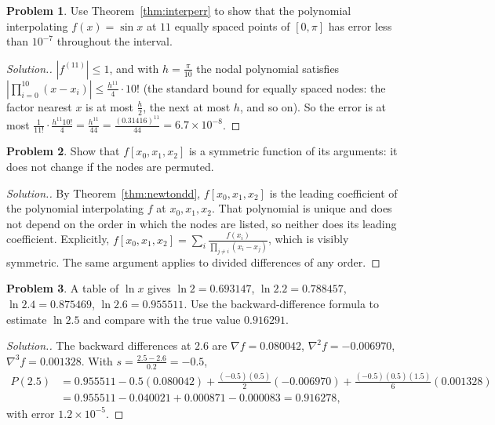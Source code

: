 \documentclass[11pt,a4paper]{article}
\numberwithin{equation}{section}
\theoremstyle{definition}
\newtheorem{problemx}{Problem}[subsection]
\newenvironment{problem}{\begin{problemx}}{\end{problemx}}
\newenvironment{solution}
  {\renewcommand{\qedsymbol}{}\begin{proof}[\textit{Solution}.]}
  {\end{proof}}
\begin{document}
\begin{problem}
Use Theorem~\ref{thm:interperr} to show that the polynomial interpolating $f(x) = \sin x$ at $11$ equally spaced points of $[0,\pi]$ has error
less than $10^{-7}$ throughout the interval.
\end{problem}
\begin{solution}
$|f^{(11)}|\leq1$, and with $h = \frac{\pi}{10}$ the nodal polynomial satisfies $\left|\prod_{i=0}^{10}(x-x_i)\right|\leq\frac{h^{11}}{4}\cdot10!$ (the
standard bound for equally spaced nodes: the factor nearest $x$ is at most $\frac h2$, the next at most $h$, and so on). So the error is at most
$\frac{1}{11!}\cdot\frac{h^{11}10!}{4} = \frac{h^{11}}{44} = \frac{(0.31416)^{11}}{44} = 6.7\times10^{-8}$.
\end{solution}

\begin{problem}
Show that $f[x_0,x_1,x_2]$ is a symmetric function of its arguments: it does not change if the nodes are permuted.
\end{problem}
\begin{solution}
By Theorem~\ref{thm:newtondd}, $f[x_0,x_1,x_2]$ is the leading coefficient of the polynomial interpolating $f$ at $x_0,x_1,x_2$. That polynomial
is unique and does not depend on the order in which the nodes are listed, so neither does its leading coefficient. Explicitly,
$f[x_0,x_1,x_2] = \sum_{i}\frac{f(x_i)}{\prod_{j\neq i}(x_i-x_j)}$, which is visibly symmetric. The same argument applies to divided differences of any
order.
\end{solution}

\begin{problem}
A table of $\ln x$ gives $\ln2 = 0.693147$, $\ln2.2 = 0.788457$, $\ln2.4 = 0.875469$, $\ln2.6 = 0.955511$. Use the backward-difference formula to
estimate $\ln2.5$ and compare with the true value $0.916291$.
\end{problem}
\begin{solution}
The backward differences at $2.6$ are $\nabla f = 0.080042$, $\nabla^2f = -0.006970$, $\nabla^3f = 0.001328$. With $s = \frac{2.5-2.6}{0.2} = -0.5$,
\begin{align*}
P(2.5) &= 0.955511-0.5(0.080042)+\frac{(-0.5)(0.5)}{2}(-0.006970)+\frac{(-0.5)(0.5)(1.5)}{6}(0.001328)\\
&= 0.955511-0.040021+0.000871-0.000083 = 0.916278,
\end{align*}
with error $1.2\times10^{-5}$.
\end{solution}
\end{document}
